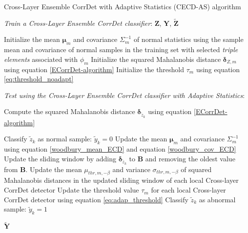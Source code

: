 \documentclass[conference]{IEEEtran}
\begin{document}
\begin{algorithm}
   \caption{Cross-Layer Ensemble CorrDet with Adaptive Statistics (CECD-AS) algorithm} \label{algo::ecd_algorithm}
    \begin{algorithmic}[1]
    	\State  \emph{ Train a Cross-Layer Ensemble CorrDet classifier}: 
      \Require $\mathbf{Z}$, $\mathbf{Y}$, $\mathbf{\widetilde{Z}}$

      \State Initialize the mean $\mathbf{\mu}_m$ and covariance $\Sigma^{-1}_m$ of normal statistics using the sample mean and covariance of normal samples in the training set with selected \textit{triple elements} associated with $\phi_m$
      \State Initialize the squared Mahalanobis distance $\mathbf{\delta}_{Z,m}$ using equation \eqref{ECorrDet-algorithm}
      \State Initialize the threshold $\tau_m$ using equation \eqref{eq:threshold_noadapt}
            
      \EndFor
      \item[]
          	\State  \emph{Test using the Cross-Layer Ensemble CorrDet classifier with Adaptive Statistics}:
      \item[]
      
      \State Compute the squared Mahalanobis distance $\mathbf{\delta}_{\widetilde{z}_k}$ using equation \eqref{ECorrDet-algorithm}
      
      \State Classify $\widetilde{z}_k$ as normal sample: $\widetilde{y}_k = 0$
      \State Update the mean $\mathbf{\mu}_m$ and covariance $\Sigma^{-1}_m$ using equation \eqref{woodbury_mean_ECD} and equation \eqref{woodbury_cov_ECD}
      \State Update the sliding window by adding $\mathbf{\delta}_{\widetilde{z}_k}$ to $\mathbf{B}$ and removing the oldest value from $\mathbf{B}$.
      \State Update the mean $\mu_{thr,m, -\beta}$ and variance $\sigma_{thr,m, -\beta}$ of squared Mahalanobis distances in the updated sliding window of each local Cross-layer CorrDet detector 
      \State Update the threshold value $\tau_m$ for each local Cross-layer CorrDet detector using equation \eqref{eq:adap_threshold}
      \Else
      \State Classify $\widetilde{z}_k$ as abnormal sample: $\widetilde{y}_k = 1$
      \EndIf
      
     \EndFor
      \Ensure $\mathbf{\widetilde{Y}}$
\end{algorithmic}
\end{algorithm}
\end{document}
